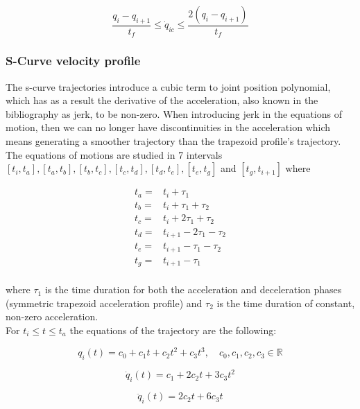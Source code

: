 \begin{equation}
\frac{q_i - q_{i+1}}{t_f} \leq \dot{q}_{ic} \leq \frac{2(q_i - q_{i+1})}{t_f}
\end{equation}


\subsubsection{S-Curve velocity profile}

The s-curve trajectories introduce a cubic term to joint position polynomial, which has as a result the derivative of the acceleration, also known in the bibliography as jerk, to be non-zero. When introducing jerk
in the equations of motion, then we can no longer have discontinuities in the acceleration which means generating a smoother trajectory than the trapezoid profile's trajectory. The equations of motions are studied 
in 7 intervals $[t_i, t_a], [t_a, t_b], [t_b, t_c], [t_c, t_d], [t_d, t_e], [t_e, t_g]$ and $[t_g, t_{i+1}]$ where 

\begin{equation}
\begin{aligned}
t_a ={}& t_i + τ_1 \\
t_b ={}& t_i + τ_1 + τ_2 \\
t_c ={}& t_i + 2τ_1 + τ_2 \\
t_d ={}& t_{i+1} - 2τ_1 - τ_2 \\
t_e ={}& t_{i+1} - τ_1 - τ_2 \\
t_g ={}& t_{i+1} - τ_1 \\
\end{aligned}
\end{equation}

where $τ_1$ is the time duration for both the acceleration and deceleration phases (symmetric trapezoid acceleration profile) and $τ_2$ is the time duration of constant, non-zero acceleration. \\

For $t_i \leq t \leq t_a$ the equations of the trajectory are the following:

\begin{equation}
q_i(t) = c_0 + c_1t + c_2t^2 + c_3t^3, \quad c_0,c_1,c_2,c_3 \in \mathbb{R}
\end{equation}

\begin{equation}
\dot{q}_i(t) = c_1 + 2c_2t + 3c_3t^2
\end{equation}

\begin{equation}
\ddot{q}_i(t) = 2c_2t + 6c_3t
\end{equation}

